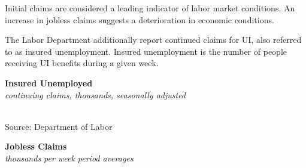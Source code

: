 \documentclass{report}
\newcommand{\tbllink}[1]{\href{https://raw.githubusercontent.com/bdecon/US-chartbook/master/chartbook/data/#1}{\faTable}}
\newcommand{\shticks}{
		date coordinates in=x, axis line style={draw=none},
		xmax={2024-01-31},
		}
\newcommand{\bbar}[2]{extra #1 ticks = {{#2}}, extra #1 tick labels = ,
		extra #1 tick style = {grid=major, grid style={thick, black!25}},}
\newcommand{\stdline}[4]{\addplot[very thick, no markers, color=#1] 
		table [x=#2, y=#3, col sep=comma] {#4};	}
\begin{document}
{\begin{minipage}{0.31\textwidth}
Initial claims are considered a leading indicator of labor market conditions. An increase in jobless claims suggests a deterioration in economic conditions. 
\end{minipage}
\vspace{1mm}

\begin{minipage}{1.0\textwidth}
\small The Labor Department additionally report continued claims for UI, also referred to as insured unemployment. Insured unemployment is the number of people receiving UI benefits during a given week. 
\end{minipage}

\begin{minipage}{0.41\textwidth}
\normalsize \textbf{Insured Unemployed}\\
\footnotesize{\textit{continuing claims, thousands, seasonally adjusted}}
\vspace*{-2mm}

\hspace*{-2mm} \\
\footnotesize{Source: Department of Labor} \hfill \tbllink{ccsa.csv} \hspace{1mm}
\end{minipage} \hspace{5mm} \begin{minipage}{0.31\textwidth}
\small 


\end{minipage}
\vspace{5mm}

\begin{minipage}{1.0\textwidth}
\normalsize \textbf{Jobless Claims}\\
\footnotesize{\textit{thousands per week \hspace{52mm} period averages}}\\
\noindent \hspace*{-2mm}  \setlength{\tabcolsep}{4.1pt} \color{black!90}
		{\renewcommand{\arraystretch}{1.6}
		 \begin{tabular}{p{32mm} R{10mm} R{10mm} R{10mm} R{10mm} R{8mm} R{8mm} R{8mm} }
			  \hline
		\end{tabular}}\vspace{-2mm}
		

\end{minipage}}
\end{document}
